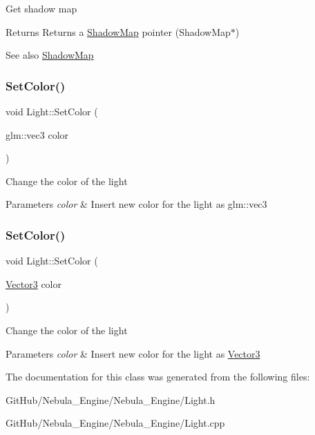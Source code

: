 Get shadow map \begin{DoxyReturn}{Returns}
Returns a \mbox{\hyperlink{class_shadow_map}{Shadow\+Map}} pointer (Shadow\+Map$\ast$) 
\end{DoxyReturn}
\begin{DoxySeeAlso}{See also}
\mbox{\hyperlink{class_shadow_map}{Shadow\+Map}} 
\end{DoxySeeAlso}
\mbox{\label{class_light_a8f8a8fea92c0de4dcf67c77ac835fe29}} 
\subsubsection{\texorpdfstring{SetColor()}{SetColor()}\hspace{0.1cm}{\footnotesize\ttfamily [1/2]}}
{\footnotesize\ttfamily void Light\+::\+Set\+Color (\begin{DoxyParamCaption}\item[{glm\+::vec3}]{color }\end{DoxyParamCaption})}

Change the color of the light 
\begin{DoxyParams}{Parameters}
{\em color} & Insert new color for the light as glm\+::vec3 \\
\hline
\end{DoxyParams}
\mbox{\label{class_light_a002cd53d4e244c97f2e101e2430613e5}} 
\subsubsection{\texorpdfstring{SetColor()}{SetColor()}\hspace{0.1cm}{\footnotesize\ttfamily [2/2]}}
{\footnotesize\ttfamily void Light\+::\+Set\+Color (\begin{DoxyParamCaption}\item[{\mbox{\hyperlink{struct_vector3}{Vector3}}}]{color }\end{DoxyParamCaption})}

Change the color of the light 
\begin{DoxyParams}{Parameters}
{\em color} & Insert new color for the light as \mbox{\hyperlink{struct_vector3}{Vector3}} \\
\hline
\end{DoxyParams}


The documentation for this class was generated from the following files\+:\begin{DoxyCompactItemize}
\item 
Git\+Hub/\+Nebula\+\_\+\+Engine/\+Nebula\+\_\+\+Engine/Light.\+h\item 
Git\+Hub/\+Nebula\+\_\+\+Engine/\+Nebula\+\_\+\+Engine/Light.\+cpp\end{DoxyCompactItemize}
